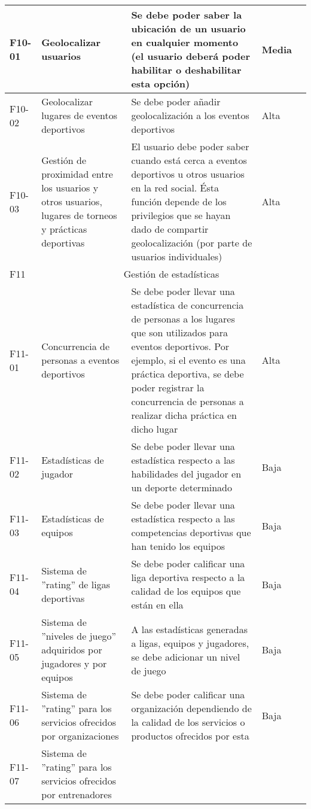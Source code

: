 \begin{center}
\begin{longtable}{|p{1.5cm}|p{3cm}|p{5cm}|p{2cm}|p{3cm}|}
			\hline
			F10-01 & 
			Geolocalizar usuarios & 
			Se debe poder saber la ubicación de un usuario en cualquier momento (el usuario deberá poder habilitar o deshabilitar esta opción) &
			Media & 
			\\
			\hline
			F10-02 & 
			Geolocalizar lugares de eventos deportivos & 
			Se debe poder añadir geolocalización a los eventos deportivos &
			Alta & 
			\\
			\hline
			F10-03 & 
			Gestión de proximidad entre los usuarios y otros usuarios, lugares de torneos y prácticas deportivas & 
			El usuario debe poder saber cuando está cerca a eventos deportivos u otros usuarios
en la red social. Ésta función depende de los privilegios que se hayan dado de compartir geolocalización (por parte de usuarios individuales) &
			Alta & 
			\\
			\hline
			F11 & 
			\multicolumn{4}{c|}{Gestión de estadísticas} \\
			\hline
			F11-01 & 
			Concurrencia de personas a eventos deportivos & 
			Se debe poder llevar una estadística de concurrencia de personas a los lugares que  son utilizados para eventos deportivos. Por ejemplo, si el evento es una práctica deportiva, se debe poder registrar la concurrencia de personas a realizar dicha práctica en dicho lugar &
			Alta & 
			\\
			\hline
			F11-02 & 
			Estadísticas de jugador & 
			Se debe poder llevar una estadística respecto a las habilidades del jugador en un
deporte determinado &
			Baja & 
			\\
			F11-03 & 
			Estadísticas de equipos & 
			Se debe poder llevar una estadística respecto a las competencias deportivas que
han tenido los equipos &
			Baja & 
			\\
			\hline
			F11-04 & 
			Sistema de ''rating'' de ligas deportivas & 
			Se debe poder calificar una liga deportiva respecto a la calidad de los equipos que están en ella &
			Baja & 
			\\
			\hline
			F11-05 & 
			Sistema de ''niveles de juego'' adquiridos por jugadores y por equipos & 
			A las estadísticas generadas a ligas, equipos y jugadores, se debe adicionar un nivel de juego &
			Baja & 
			\\
			\hline
			F11-06 & 
			Sistema de ''rating'' para los servicios ofrecidos por organizaciones & 
			Se debe poder calificar una organización dependiendo de la calidad de los servicios o productos ofrecidos por esta &
			Baja & 
			\\
			\hline
			F11-07 & 
			Sistema de ''rating'' para los servicios ofrecidos por entrenadores & 

\end{longtable}
\end{center}
